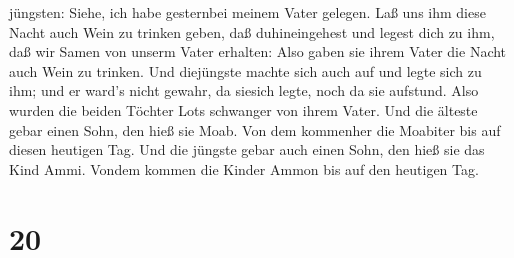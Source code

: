 jüngsten: Siehe, ich habe gesternbei meinem Vater gelegen. Laß uns ihm
diese Nacht auch Wein zu trinken geben, daß duhineingehest und legest
dich zu ihm, daß wir Samen von unserm Vater erhalten:  Also
gaben sie ihrem Vater die Nacht auch Wein zu trinken. Und diejüngste
machte sich auch auf und legte sich zu ihm; und er ward's nicht gewahr,
da siesich legte, noch da sie aufstund.  Also wurden die
beiden Töchter Lots schwanger von ihrem Vater.  Und die
älteste gebar einen Sohn, den hieß sie Moab. Von dem kommenher die
Moabiter bis auf diesen heutigen Tag.  Und die jüngste
gebar auch einen Sohn, den hieß sie das Kind Ammi. Vondem kommen die
Kinder Ammon bis auf den heutigen Tag.

\hypertarget{section-19}{%
\section{20}\label{section-19}}


